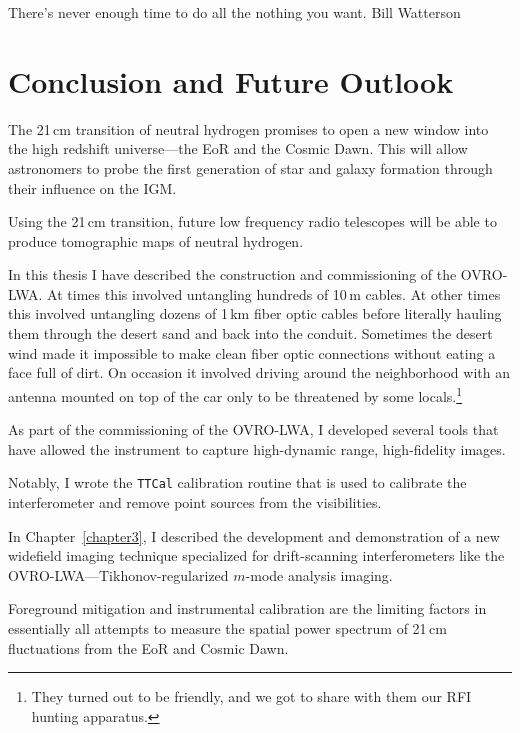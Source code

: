 \cleartoevenpage

\myepigraph
{There's never enough time to do all the nothing you want.}
{Bill Watterson}

\chapter{Conclusion and Future Outlook}
\label{chapter5}

\begin{bibunit}

The 21\,cm transition of neutral hydrogen promises to open a new window into the high redshift
universe---the EoR and the Cosmic Dawn. This will allow astronomers to probe the first generation of
star and galaxy formation through their influence on the IGM.

Using the 21\,cm transition, future low frequency radio telescopes will be able to produce
tomographic maps of neutral hydrogen.

In this thesis I have described the construction and commissioning of the OVRO-LWA.  At times this
involved untangling hundreds of 10\,m cables. At other times this involved untangling dozens of
1\,km fiber optic cables before literally hauling them through the desert sand and back into the
conduit.  Sometimes the desert wind made it impossible to make clean fiber optic connections without
eating a face full of dirt. On occasion it involved driving around the neighborhood with an
antenna mounted on top of the car only to be threatened by some locals.\footnote{
    They turned out to be friendly, and we got to share with them our RFI hunting apparatus.
}

As part of the commissioning of the OVRO-LWA, I developed several tools that have allowed the
instrument to capture high-dynamic range, high-fidelity images.

Notably, I wrote the \texttt{TTCal} calibration routine that is used to calibrate the interferometer
and remove point sources from the visibilities.

In Chapter~\ref{chapter3}, I described the development and demonstration of a new widefield imaging
technique specialized for drift-scanning interferometers like the OVRO-LWA---Tikhonov-regularized
$m$-mode analysis imaging.

Foreground mitigation and instrumental calibration are the limiting factors in essentially all
attempts to measure the spatial power spectrum of 21\,cm fluctuations from the EoR and Cosmic Dawn.


\end{bibunit}
